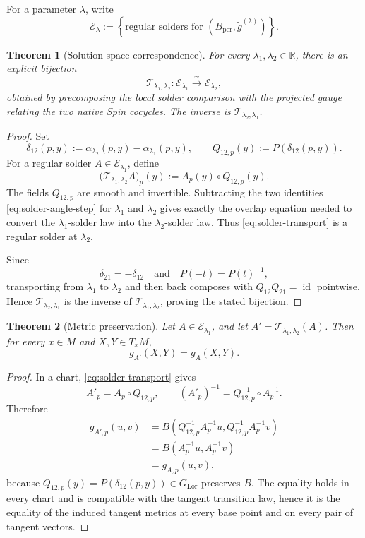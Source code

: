 \documentclass[11pt,a4paper]{article}
\newtheorem{theorem}{Theorem}[section]
\theoremstyle{definition}
\theoremstyle{remark}
\newcommand{\R}{\mathbb{R}}
\newcommand{\LorG}{G_{\mathrm{Lor}}}
\newcommand{\id}{\operatorname{id}}
\newcommand{\cE}{\mathcal{E}}
\begin{document}
For a parameter \(\lambda\), write
\[
   \cE_{\lambda}
   :=
   \left\{
      \text{regular solders for }
      (B_{\mathrm{per}},\widetilde g^{(\lambda)})
   \right\}.
\tag{11.8}
\]

\begin{theorem}[Solution-space correspondence]
\label{thm:solution-correspondence}
For every \(\lambda_{1},\lambda_{2}\in\R\), there is an explicit bijection
\[
   \mathcal T_{\lambda_{1},\lambda_{2}}:
   \cE_{\lambda_{1}}
   \xrightarrow{\;\sim\;}
   \cE_{\lambda_{2}},
\tag{11.9}\label{eq:solution-bijection}
\]
obtained by precomposing the local solder comparison with the projected
gauge relating the two native Spin cocycles.  The inverse is
\(\mathcal T_{\lambda_{2},\lambda_{1}}\).
\end{theorem}

\begin{proof}
Set
\[
   \delta_{12}(p,y)
   :=\alpha_{\lambda_2}(p,y)-\alpha_{\lambda_1}(p,y),
   \qquad
   Q_{12,p}(y):=P(\delta_{12}(p,y)).
\tag{11.9a}\label{eq:gauge-angle}
\]
For a regular solder \(A\in\cE_{\lambda_1}\), define
\[
   \bigl(\mathcal T_{\lambda_1,\lambda_2}A\bigr)_p(y)
   :=A_p(y)\circ Q_{12,p}(y).
\tag{11.9b}\label{eq:solder-transport}
\]
The fields \(Q_{12,p}\) are smooth and invertible.  Subtracting the two
identities \eqref{eq:solder-angle-step} for \(\lambda_1\) and
\(\lambda_2\) gives exactly the overlap equation needed to convert the
\(\lambda_1\)-solder law into the \(\lambda_2\)-solder law.  Thus
\eqref{eq:solder-transport} is a regular solder at \(\lambda_2\).

Since
\[
   \delta_{21}=-\delta_{12}
   \quad\text{and}\quad
   P(-t)=P(t)^{-1},
\]
transporting from \(\lambda_1\) to \(\lambda_2\) and then back composes
with \(Q_{12}Q_{21}=\id\) pointwise.  Hence
\(\mathcal T_{\lambda_2,\lambda_1}\) is the inverse of
\(\mathcal T_{\lambda_1,\lambda_2}\), proving the stated bijection.
\end{proof}

\begin{theorem}[Metric preservation]
\label{thm:metric-preservation}
Let \(A\in\cE_{\lambda_{1}}\), and let
\(A'=\mathcal T_{\lambda_{1},\lambda_{2}}(A)\).
Then for every \(x\in M\) and \(X,Y\in T_xM\),
\[
   g_{A'}(X,Y)=g_A(X,Y).
\tag{11.10}
\]
\end{theorem}

\begin{proof}
In a chart, \eqref{eq:solder-transport} gives
\[
    A'_p=A_p\circ Q_{12,p},
    \qquad
    (A'_p)^{-1}=Q_{12,p}^{-1}\circ A_p^{-1}.
\]
Therefore
\[
\begin{aligned}
 g_{A',p}(u,v)
 &=B\!\left(Q_{12,p}^{-1}A_p^{-1}u,
            Q_{12,p}^{-1}A_p^{-1}v\right)\\
 &=B\!\left(A_p^{-1}u,A_p^{-1}v\right)\\
 &=g_{A,p}(u,v),
\end{aligned}
\]
because \(Q_{12,p}(y)=P(\delta_{12}(p,y))\in\LorG\) preserves \(B\).
The equality holds in every chart and is compatible with the tangent
transition law, hence it is the equality of the induced tangent metrics at
every base point and on every pair of tangent vectors.
\end{proof}
\end{document}
